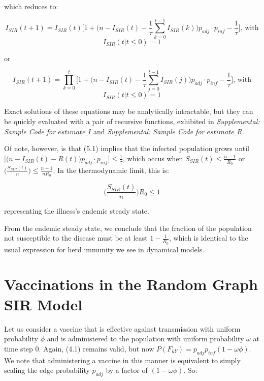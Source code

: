 \documentclass[psamsfonts]{amsart}
\theoremstyle{definition}
\theoremstyle{remark}
\numberwithin{equation}{section}
\begin{document}
which reduces to:

\begin{equation}
I_{SIR}(t+1) = I_{SIR}(t)\Bigg[1 + \Big(n - I_{SIR}(t) - \frac{1}{\tau} \sum_{k=0}^{t-1}I_{SIR}(k)\Big)p_{adj} \cdot p_{inf} -  \frac{1}{\tau}\Bigg] \text{, with}
\end{equation}
\begin{equation}
I_{SIR}(t | t\leq0)=1 \nonumber
\end{equation}

or

\begin{equation}
I_{SIR}(t+1) = \prod_{k=0}^t\Bigg[1 + \Big(n - I_{SIR}(t) - \frac{1}{\tau} \sum_{j=0}^{t-1}I_{SIR}(j)\Big)p_{adj} \cdot p_{inf} -  \frac{1}{\tau}\Bigg] \text{, with}
\end{equation}
\begin{equation}
I_{SIR}(t | t\leq0)=1 \nonumber
\end{equation}

Exact solutions of these equations may be analytically intractable, but they can be quickly evaluated with a pair of recursive functions, exhibited in \textit{Supplemental: Sample Code for $estimate\_I$} and \textit{Supplemental: Sample Code for $estimate\_R$}.

Of note, however, is that (5.1) implies that the infected population grows until $\Bigg[\Big(n - I_{SIR}(t) - R(t)\Big)p_{adj} \cdot p_{inf}\Bigg] \leq \frac{1}{\tau}$, which occus when $S_{SIR}(t) \leq \frac{n-1}{R_0}$ or $\Big(\frac{S_{SIR}(t)}{n}\Big)\leq \frac{n-1}{nR_0}$. In the thermodynamic limit, this is:

\begin{equation}
\Big(\frac{S_{SIR}(t)}{n}\Big)R_0 \leq 1
\end{equation}

representing the illness's endemic steady state.

From the endemic steady state, we conclude that the fraction of the population not susceptible to the disease must be at least $1 - \frac{1}{R_0}$, which is identical to the usual expression for herd immunity we see in dynamical models.

\section{Vaccinations in the Random Graph SIR Model}

Let us consider a vaccine that is effective against transmission with uniform probability $\phi$ and is administered to the population with uniform probability $\omega$ at time step 0. Again, (4.1) remains valid, but now $P(F_{kY}) = p_{adj}p_{inf}(1-\omega\phi)$. We note that administering a vaccine in this manner is equivalent to simply scaling the edge probability $p_{adj}$ by a factor of $(1-\omega\phi)$. So:
\end{document}
